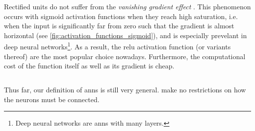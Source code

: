 \documentclass[../main.tex]{subfiles}
\begin{document}
Rectified units do not suffer from the \emph{vanishing gradient effect} \cite{glorot2011}.
This phenomenon occurs with sigmoid activation functions when they reach high saturation, i.e. when the input is significantly far from zero such that the gradient is almost horizontal (see \cref{fig:activation_functions_sigmoid}), and is especially prevelant in deep neural networks\footnote{Deep neural networks are \glspl{ann} with many layers.}.
As a result, the \gls{relu} activation function (or variants thereof) are the most popular choice nowadays.
Furthermore, the computational cost of the function itself as well as its gradient is cheap.

\subsection{}
Thus far, our definition of \glspl{ann} is still very general.
 make no restrictions on how the neurons must be connected.


\end{document}

